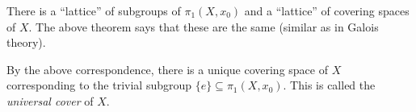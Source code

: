 \begin{remark}
  There is a ``lattice'' of subgroups of
  $\pi_1(X, x_0)$ and a ``lattice'' of covering
  spaces of $X$. The above theorem says that these are
  the same (similar as in Galois theory).
\end{remark}

\begin{remark}
  By the above correspondence, there is a unique covering
  space of $X$ corresponding to the trivial subgroup $\{e\} \subseteq \pi_1(X, x_0)$. This is
  called the \emph{universal cover} of $X$.
\end{remark}
